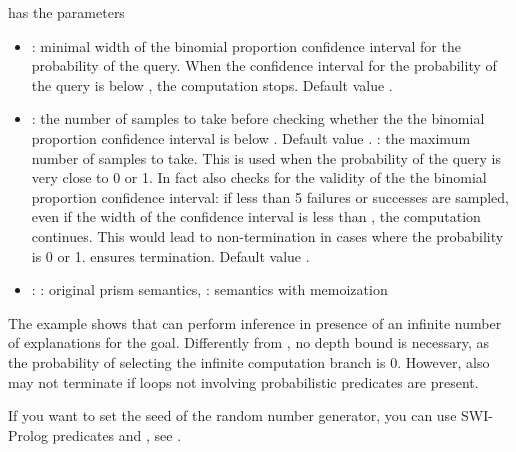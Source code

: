 \documentclass[letterpaper,10pt,english]{sphinxmanual}
\begin{document}
 has the parameters
\begin{itemize}
\item {} 
: minimal width of the binomial proportion confidence interval for the probability of the query. When the confidence interval for the probability of the query is below , the computation stops. Default value .

\item {} 
: the number of samples to take before checking whether the the binomial proportion confidence interval is below . Default value . : the maximum number of samples to take. This is used when the probability of the query is very close to 0 or 1. In fact  also checks for the validity of the the binomial proportion confidence interval: if less than 5 failures or successes are sampled, even if the width of the confidence interval is less than , the computation continues. This would lead to non-termination in cases where the probability is 0 or 1.  ensures termination. Default value .

\item {} 
: : original prism semantics, : semantics with memoization

\end{itemize}

The example  shows that  can perform inference in presence of an infinite number of explanations for the goal.
Differently from , no depth bound is necessary, as the probability of selecting the infinite computation branch is 0.
However, also  may not terminate if loops not involving probabilistic predicates are present.

If you want to set the seed of the random number generator, you can use SWI-Prolog predicates  and , see .
\end{document}
